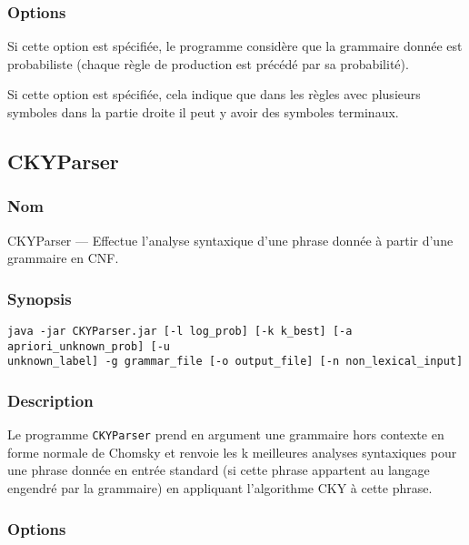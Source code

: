 \documentclass[12pt]{article}
\begin{document}
\subsubsection{Options}

\begin{description}[style=nextline]
\item[\texttt{-p, --prob}] Si cette option est sp\'ecifi\'ee, le programme consid\`ere
que la grammaire donn\'ee est probabiliste (chaque r\`egle de production est
pr\'ec\'ed\'e par sa probabilit\'e).
\item[\texttt{-t, --term\_droite}] Si cette option est sp\'ecifi\'ee, cela
indique que dans les r\`egles avec plusieurs symboles dans la partie
droite il peut y avoir des symboles terminaux.
\end{description}

\subsection{CKYParser}
\subsubsection{Nom}

CKYParser --- Effectue l'analyse syntaxique d'une phrase donn\'ee \`a partir d'une
grammaire en CNF.

\subsubsection{Synopsis}

{\ttfamily
\begin{verbatim}
java -jar CKYParser.jar [-l log_prob] [-k k_best] [-a apriori_unknown_prob] [-u
unknown_label] -g grammar_file [-o output_file] [-n non_lexical_input]
\end{verbatim}
}

\subsubsection{Description}

Le programme \texttt{CKYParser} prend en argument une grammaire hors contexte
en forme normale de Chomsky et renvoie les k meilleures analyses syntaxiques
pour une phrase donn\'ee en entr\'ee standard (si cette phrase appartent au langage
engendr\'e par la grammaire) en appliquant l'algorithme CKY \`a cette phrase.

\subsubsection{Options}
\end{document}
